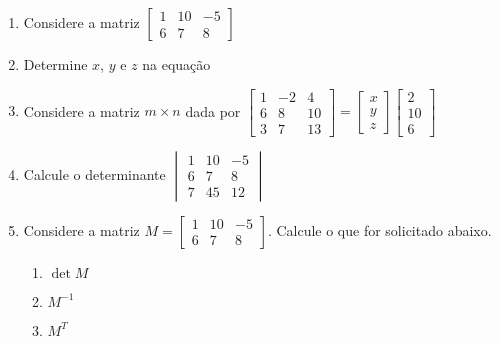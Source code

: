 \documentclass[a4paper,12pt]{article}
\begin{document}
\begin{enumerate}
\item Considere a matriz
$\begin{bmatrix}
 1 & 10 & -5 \\
 6 & 7 & 8
 \end{bmatrix}
$
\item Determine $x$, $y$ e $z$ na equação
\item Considere a matriz $m\times n$ dada por
$\begin{bmatrix}
1 & -2 & 4  \\
6 & 8 & 10  \\
3 & 7 & 13
 \end{bmatrix}
 =
  \begin{bmatrix}
 x\\
 y\\
 z
 \end{bmatrix}
 \begin{bmatrix}
 2\\
 10\\
 6
 \end{bmatrix}
$
\item Calcule o determinante
$\begin{vmatrix}
 1 & 10 & -5 \\
 6 & 7 & 8 \\
 7 & 45 & 12
 \end{vmatrix}
$
\item Considere a matriz
$M = \begin{bmatrix}
 1 & 10 & -5 \\
 6 & 7 & 8
 \end{bmatrix}
$. Calcule o que for solicitado abaixo.
\begin{enumerate}
\item $\det M$
\item $M^{-1}$
\item $M^T$
\end{enumerate}
\end{enumerate}
\end{document}
